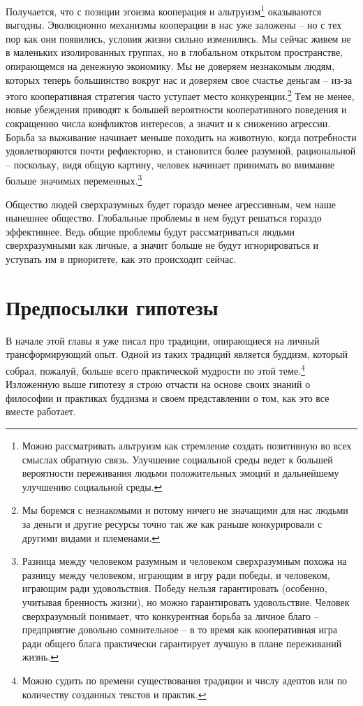 \documentclass[12pt,a4paper]{report}
\begin{document}
\noindent Получается, что с позиции эгоизма кооперация и альтруизм\footnote{Можно рассматривать альтруизм как стремление создать позитивную во всех смыслах обратную связь. Улучшение социальной среды ведет к большей вероятности переживания людьми положительных эмоций и дальнейшему улучшению социальной среды.} оказываются выгодны. Эволюционно механизмы кооперации в нас уже заложены -- но с тех пор как они появились, условия жизни сильно изменились. Мы сейчас живем не в маленьких изолированных группах, но в глобальном открытом пространстве, опирающемся на денежную экономику. Мы не доверяем незнакомым людям, которых теперь большинство вокруг нас и доверяем свое счастье деньгам -- из-за этого кооперативная стратегия часто уступает место конкуренции.\footnote{Мы боремся с незнакомыми и потому ничего не значащими для нас людьми за деньги и другие ресурсы точно так же как раньше конкурировали с другими видами и племенами.} Тем не менее, новые убеждения приводят к большей вероятности кооперативного поведения и сокращению числа конфликтов интересов, а значит и к снижению агрессии. Борьба за выживание начинает меньше походить на животную, когда потребности удовлетворяются почти рефлекторно, и становится более разумной, рациональной -- поскольку, видя общую картину, человек начинает принимать во внимание больше значимых переменных.\footnote{Разница между человеком разумным и человеком сверхразумным похожа на разницу между человеком, играющим в игру ради победы, и человеком, играющим ради удовольствия. Победу нельзя гарантировать (особенно, учитывая бренность жизни), но можно гарантировать удовольствие. Человек сверхразумный понимает, что конкурентная борьба за личное благо -- предприятие довольно сомнительное -- в то время как кооперативная игра ради общего блага практически гарантирует лучшую в плане переживаний жизнь.}

\noindent Общество людей сверхразумных будет гораздо менее агрессивным, чем наше нынешнее общество. Глобальные проблемы в нем будут решаться гораздо эффективнее. Ведь общие проблемы будут рассматриваться людьми сверхразумными как личные, а значит больше не будут игнорироваться и уступать им в приоритете, как это происходит сейчас.

\section*{Предпосылки гипотезы}

В начале этой главы я уже писал про традиции, опирающиеся на личный трансформирующий опыт. Одной из таких традиций является буддизм, который собрал, пожалуй, больше всего практической мудрости по этой теме.\footnote{Можно судить по времени существования традиции и числу адептов или по количеству созданных текстов и практик.} Изложенную выше гипотезу я строю отчасти на основе своих знаний о философии и практиках буддизма и своем представлении о том, как это все вместе работает.
\end{document}
